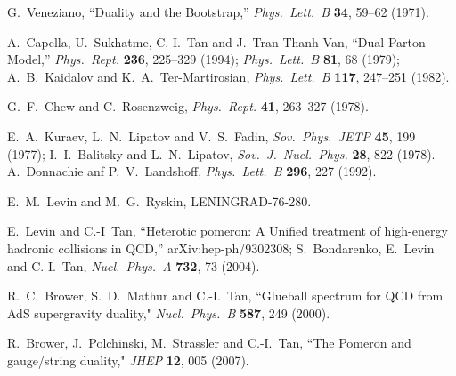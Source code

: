 \documentclass[11pt, oneside]{article}   	%
\newcommand{\<}{\langle}
\renewcommand{\>}{\rangle}
\numberwithin{equation}{section}
\numberwithin{figure}{section}
\begin{document}
\begin{thebibliography}{99}
G.~Veneziano,
``Duality and the Bootstrap,''
{\it Phys.~Lett.~B} \textbf{34}, 59--62 (1971).

 
A.~Capella, U.~Sukhatme, C.-I.~Tan and J.~Tran Thanh Van, 
``Dual Parton Model,''
{\it Phys.~Rept.} {\bf 236}, 225--329 (1994); {\it Phys.~Lett.~B} {\bf 81}, 68 (1979);
A.~B.~Kaidalov and K.~A.~Ter-Martirosian,
{\it Phys.~Lett.~B} \textbf{117}, 247--251 (1982).

G.~F.~Chew and C.~Rosenzweig,
{\it Phys.~Rept.} \textbf{41}, 263--327 (1978).





  E.~A.~Kuraev, L.~N.~Lipatov and V.~S.~Fadin,
  {\it Sov.\ Phys.\ JETP} {\bf 45}, 199 (1977);  I.~I.~Balitsky and L.~N.~Lipatov,
  {\it Sov.\ J.\ Nucl.\ Phys.} {\bf 28}, 822 (1978).  
  A.~Donnachie anf P.~V.~Landshoff, 
 {\it Phys.~Lett.~B} \textbf {296}, 227 (1992).

  E.~M.~Levin and M.~G.~Ryskin,
  LENINGRAD-76-280.
  
  E.~Levin and C.-I~Tan,
  ``Heterotic pomeron: A Unified treatment of high-energy hadronic collisions in QCD,''  arXiv:hep-ph/9302308; S.~Bondarenko, E.~Levin and C.-I.~Tan,
 {\it  Nucl.\ Phys.\ A} {\bf 732}, 73 (2004).
 
  
R.~C.~Brower, S.~D.~Mathur and C.-I.~Tan,
``Glueball spectrum for QCD from AdS supergravity duality," 
{\it Nucl.~Phys.~B} \textbf{587}, 249 (2000).



    R.~Brower,  J.~Polchinski, M.~Strassler and C.-I.~Tan, 
``The Pomeron and gauge/string duality,"
{\it  JHEP} {\bf 12}, 005 (2007).
    

\end{thebibliography}
\end{document}
